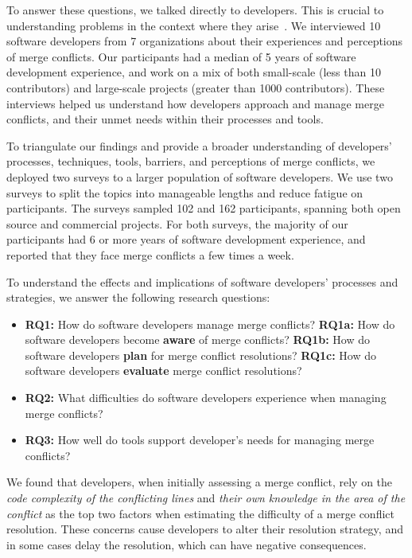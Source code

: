 To answer these questions, we talked directly to developers.
This is crucial to understanding problems in the context where they arise~\cite{fritz2010using, sillito2006questions, de2008answering, ko2007information}.
We interviewed 10 software developers from 7 organizations about their experiences and perceptions of merge conflicts. %
Our participants had a median of 5 years of software development experience, and work on a mix of both small-scale (less than 10 contributors) and large-scale projects (greater than 1000 contributors).
These interviews helped us understand how developers approach and manage merge conflicts, and their unmet needs within their processes and tools.

To triangulate our findings and provide a broader understanding of developers' processes, techniques, tools, barriers, and perceptions of merge conflicts, we deployed two surveys to a larger population of software developers.
We use two surveys to split the topics into manageable lengths and reduce fatigue on participants.
The surveys sampled 102 and 162 participants, spanning both open source and commercial projects. 
For both surveys, the majority of our participants had 6 or more years of software development experience, and reported that they face merge conflicts a few times a week.

To understand the effects and implications of software developers' processes and strategies, we answer the following research questions:

\begin{itemize}[label=$\bullet$]
\item \textbf{RQ1:} How do software developers manage merge conflicts?
\subitem \textbf{RQ1a:} How do software developers become \textbf{aware} of merge conflicts?
\subitem \textbf{RQ1b:} How do software developers \textbf{plan} for merge conflict resolutions?
\subitem \textbf{RQ1c:} How do software developers \textbf{evaluate} merge conflict resolutions?
\item \textbf{RQ2:} What difficulties do software developers experience when managing merge conflicts?
\item \textbf{RQ3:} How well do tools support developer's needs for managing merge conflicts?
\end{itemize}

We found that developers, when initially assessing a merge conflict, rely on the \textit{code complexity of the conflicting lines} and \textit{their own knowledge in the area of the conflict} as the top two factors when estimating the difficulty of a merge conflict resolution.
These concerns cause developers to alter their resolution strategy, and in some cases delay the resolution, which can have negative consequences.

